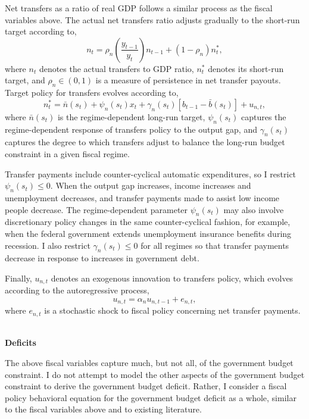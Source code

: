 \documentclass[11pt]{article}
\newcommand{\beq}{\begin{equation}}
\newcommand{\eeq}{\end{equation}}
\begin{document}
\noindent Net transfers as a ratio of real GDP follows a similar process as the fiscal variables above.  The actual net transfers ratio adjusts gradually to the short-run target according to,
\beq \label{eq:tranrat} n_t = \rho_n \left( \frac{y_{t-1}}{y_t} \right) n_{t-1} + \left( 1 - \rho_n \right) n_t^*, \eeq
where $n_t$ denotes the actual transfers to GDP ratio, $n_t^*$ denotes its short-run target, and $\rho_n \in (0,1)$ is a measure of persistence in net transfer payouts.  Target policy for transfers evolves according to,
\beq \label{eq:trantarget} n_t^* = \bar{n}(s_t) + \psi_n(s_t) x_t + \gamma_n(s_t) \left[ b_{t-1} - \bar{b}(s_t) \right] + u_{n,t}, \eeq
where $\bar{n}(s_t)$ is the regime-dependent long-run target, $\psi_n(s_t)$ captures the regime-dependent response of transfers policy to the output gap, and $\gamma_n(s_t)$ captures the degree to which transfers adjust to balance the long-run budget constraint in a given fiscal regime. 

Transfer payments include counter-cyclical automatic expenditures, so I restrict $\psi_n(s_t) \leq 0$.  When the output gap increases, income increases and unemployment decreases, and transfer payments made to assist low income people decrease.  The regime-dependent parameter $\psi_n(s_t)$ may also involve discretionary policy changes in the same counter-cyclical fashion, for example, when the federal government extends unemployment insurance benefits during recession.  I also restrict $\gamma_n(s_t) \leq 0$ for all regimes so that transfer payments decrease in response to increases in government debt.

Finally, $u_{n,t}$ denotes an exogenous innovation to transfers policy, which evolves according to the autoregressive process,
\beq \label{eq:tranarshock} u_{n,t} = \alpha_n u_{n,t-1} + e_{n,t}, \eeq
where $e_{n,t}$ is a stochastic shock to fiscal policy concerning net transfer payments.

\ \\ \noindent \textbf{Deficits}

\noindent The above fiscal variables capture much, but not all, of the government budget constraint.  I do not attempt to model the other aspects of the government budget constraint to derive the government budget deficit.  Rather, I consider a fiscal policy behavioral equation for the government budget deficit as a whole, similar to the fiscal variables above and to existing literature.
\end{document}
